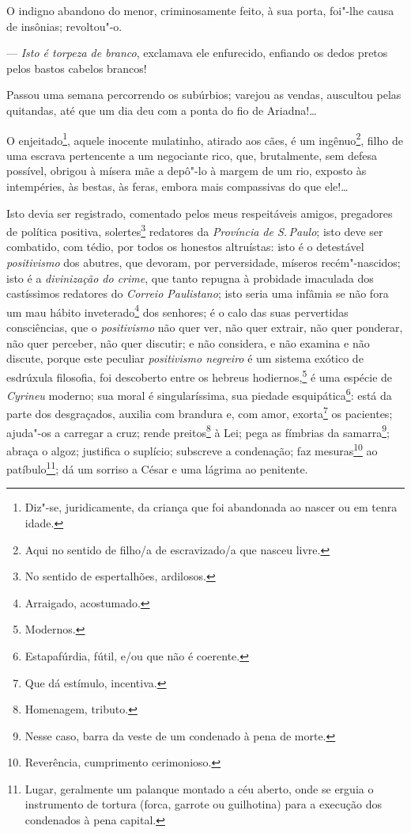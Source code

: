 O indigno abandono do menor, criminosamente feito, à sua porta, foi"-lhe
causa de insônias; revoltou"-o.

--- \emph{Isto é torpeza de branco}, exclamava ele enfurecido, enfiando
os dedos pretos pelos bastos cabelos brancos!

Passou uma semana percorrendo os subúrbios; varejou as vendas, auscultou
pelas quitandas, até que um dia deu com a ponta do fio de Ariadna!\ldots{}

O enjeitado\footnote{Diz"-se, juridicamente, da criança que foi
  abandonada ao nascer ou em tenra idade.}, aquele inocente mulatinho,
atirado aos cães, é um ingênuo\footnote{Aqui no sentido de filho/a de
  escravizado/a que nasceu livre.}, filho de uma escrava pertencente a
um negociante rico, que, brutalmente, sem defesa possível, obrigou à
mísera mãe a depô"-lo à margem de um rio, exposto às intempéries, às
bestas, às feras, embora mais compassivas do que ele!\ldots{}

Isto devia ser registrado, comentado pelos meus respeitáveis amigos,
pregadores de política positiva, solertes\footnote{No sentido de
  espertalhões, ardilosos.} redatores da \emph{Província de S.\,Paulo};
isto deve ser combatido, com tédio, por todos os honestos altruístas:
isto é o detestável \emph{positivismo} dos abutres, que devoram, por
perversidade, míseros recém"-nascidos; isto é a \emph{divinização do
crime}, que tanto repugna à probidade imaculada dos castíssimos
redatores do \emph{Correio Paulistano}; isto seria uma infâmia se não
fora um mau hábito inveterado\footnote{Arraigado, acostumado.} dos
senhores; é o calo das suas pervertidas consciências, que o
\emph{positivismo} não quer ver, não quer extrair, não quer ponderar,
não quer perceber, não quer discutir; e não considera, e não examina e
não discute, porque este peculiar \emph{positivismo negreiro} é um
sistema exótico de esdrúxula filosofia, foi descoberto entre os hebreus
hodiernos,\footnote{Modernos.} é uma espécie de \emph{Cyrineu}
moderno; sua moral é singularíssima, sua piedade esquipática\footnote{
  Estapafúrdia, fútil, e/ou que não é coerente.}: está da parte dos
desgraçados, auxilia com brandura e, com amor, exorta\footnote{Que dá
  estímulo, incentiva.} os pacientes; ajuda"-os a carregar a cruz; rende
preitos\footnote{Homenagem, tributo.} à Lei; pega as fímbrias da
samarra\footnote{Nesse caso, barra da veste de um condenado à pena de
  morte.}; abraça o algoz; justifica o suplício; subscreve a condenação;
faz mesuras\footnote{Reverência, cumprimento cerimonioso.} ao
patíbulo\footnote{Lugar, geralmente um palanque montado a céu aberto,
  onde se erguia o instrumento de tortura (forca, garrote ou guilhotina)
  para a execução dos condenados à pena capital.};
dá um sorriso a César e uma
lágrima ao penitente.

